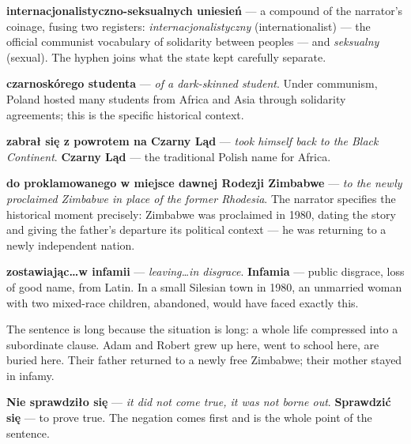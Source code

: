 \textbf{internacjonalistyczno-seksualnych uniesień} --- a compound of
the narrator's coinage, fusing two registers: \textit{internacjonalistyczny}
(internationalist) --- the official communist vocabulary of solidarity
between peoples --- and \textit{seksualny} (sexual). The hyphen joins
what the state kept carefully separate.

\textbf{czarnoskórego studenta} --- \textit{of a dark-skinned student}.
Under communism, Poland hosted many students from Africa and Asia
through solidarity agreements; this is the specific historical context.

\textbf{zabrał się z powrotem na Czarny Ląd} --- \textit{took himself
back to the Black Continent}. \textbf{Czarny Ląd} --- the traditional
Polish name for Africa.

\textbf{do proklamowanego w miejsce dawnej Rodezji Zimbabwe} --- \textit{to
the newly proclaimed Zimbabwe in place of the former Rhodesia}. The
narrator specifies the historical moment precisely: Zimbabwe was
proclaimed in 1980, dating the story and giving the father's departure
its political context --- he was returning to a newly independent nation.

\textbf{zostawiając\ldots w infamii} --- \textit{leaving\ldots in
disgrace}. \textbf{Infamia} --- public disgrace, loss of good name,
from Latin. In a small Silesian town in 1980, an unmarried woman with
two mixed-race children, abandoned, would have faced exactly this.

The sentence is long because the situation is long: a whole life
compressed into a subordinate clause. Adam and Robert grew up here,
went to school here, are buried here. Their father returned to a newly
free Zimbabwe; their mother stayed in infamy.



\textbf{Nie sprawdziło się} --- \textit{it did not come true, it was
not borne out}. \textbf{Sprawdzić się} --- to prove true. The negation
comes first and is the whole point of the sentence.

